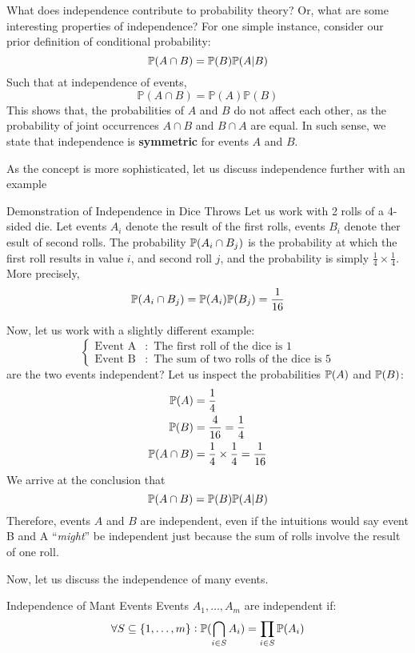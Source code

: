 What does independence contribute to probability theory? Or, what are some interesting properties of independence?
For one simple instance, consider our prior definition of conditional probability:
\[
    \mathbb{P}(A \cap B) = \mathbb{P}(B) \P(A | B)
\]
Such that at independence of events, \[\mathbb{P}(A \cap B) = \mathbb{P}(A) \mathbb{P}(B)\]
This shows that, the probabilities of $A$ and $B$ do not affect each other, as the probability of joint occurrences $A \cap B$ and $B \cap A$ are equal.
In such sense, we state that independence is \textbf{symmetric} for events $A$ and $B$.

As the concept is more sophisticated, let us discuss independence further with an example
\begin{ln-example}{Demonstration of Independence in Dice Throws}{}
    Let us work with 2 rolls of a 4-sided die. Let events $A_i$ denote the result of the first rolls, events $B_i$ denote ther esult of second rolls.
    The probability $\P(A_i \cap B_j)$ is the probability at which the first roll results in value $i$, and second roll $j$, and the probability is simply $\frac{1}{4} \times \frac{1}{4}$. \\
    More precisely, \[\P(A_i \cap B_j) = \P(A_i) \P(B_j) = \frac{1}{16}\]

    Now, let us work with a slightly different example:
    \[
        \begin{cases}
            \text{Event A} &: \text{ The first roll of the dice is $1$} \\
            \text{Event B} &: \text{ The sum of two rolls of the dice is $5$}
        \end{cases}
    \]
    are the two events independent?
    \tcblower
    Let us inspect the probabilities $\P(A)$ and $\P(B)$:
    \begin{align*}
        \P(A) &= \frac{1}{4} \\
        \P(B) &= \frac{4}{16} = \frac{1}{4} \\
        \P(A \cap B) &= \frac{1}{4} \times \frac{1}{4} = \frac{1}{16}
    \end{align*}
    We arrive at the conclusion that
    \[
        \mathbb{P}(A \cap B) = \mathbb{P}(B) \P(A | B)
    \]
    Therefore, events $A$ and $B$ are independent, even if the intuitions would say event B and A ``\textit{might}'' be independent just because the sum of rolls involve the result of one roll.
\end{ln-example}

Now, let us discuss the independence of many events.
\begin{ln-define}{Independence of Mant Events}{}
    Events $A_1, \dots, A_m$ are independent if:
    \[
        \forall S \subseteq \{1, \ldots, m\}: \P(\bigcap_{i \in S} A_i) = \prod_{i \in S} \P(A_i)
    \]
\end{ln-define}
